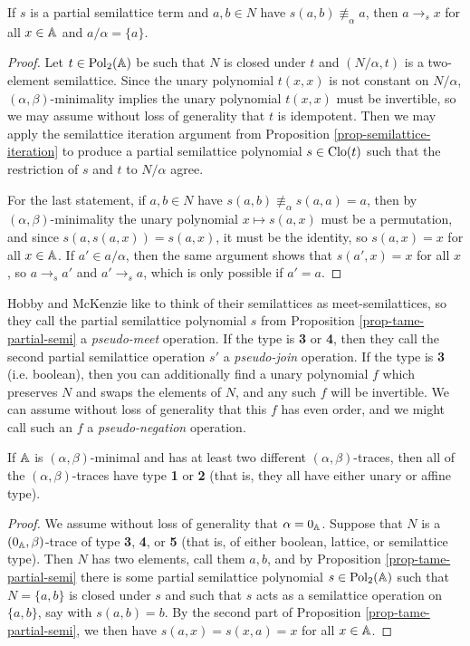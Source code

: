 \begin{appendices}
\begin{prop}
If $s$ is a partial semilattice term and $a,b \in N$ have $s(a,b) \not\equiv_\alpha a$, then $a \rightarrow_s x$ for all $x \in \mathbb{A}$ and $a/\alpha = \{a\}$.
\end{prop}
\begin{proof} Let $t \in \operatorname{Pol}_2(\mathbb{A})$ be such that $N$ is closed under $t$ and $(N/\alpha, t)$ is a two-element semilattice. Since the unary polynomial $t(x,x)$ is not constant on $N/\alpha$, $(\alpha,\beta)$-minimality implies the unary polynomial $t(x,x)$ must be invertible, so we may assume without loss of generality that $t$ is idempotent. Then we may apply the semilattice iteration argument from Proposition \ref{prop-semilattice-iteration} to produce a partial semilattice polynomial $s \in \operatorname{Clo}(t)$ such that the restriction of $s$ and $t$ to $N/\alpha$ agree.

For the last statement, if $a,b \in N$ have $s(a,b) \not\equiv_\alpha s(a,a) = a$, then by $(\alpha,\beta)$-minimality the unary polynomial $x \mapsto s(a,x)$ must be a permutation, and since $s(a,s(a,x)) = s(a,x)$, it must be the identity, so $s(a,x) = x$ for all $x \in \mathbb{A}$. If $a' \in a/\alpha$, then the same argument shows that $s(a',x) = x$ for all $x$, so $a \rightarrow_s a'$ and $a' \rightarrow_s a$, which is only possible if $a' = a$.
\end{proof}

Hobby and McKenzie \cite{hobby-mckenzie} like to think of their semilattices as meet-semilattices, so they call the partial semilattice polynomial $s$ from Proposition \ref{prop-tame-partial-semi} a \emph{pseudo-meet} operation. If the type is \textbf{3} or \textbf{4}, then they call the second partial semilattice operation $s'$ a \emph{pseudo-join} operation. If the type is \textbf{3} (i.e. boolean), then you can additionally find a unary polynomial $f$ which preserves $N$ and swaps the elements of $N$, and any such $f$ will be invertible. We can assume without loss of generality that this $f$ has even order, and we might call such an $f$ a \emph{pseudo-negation} operation.

\begin{prop}\label{prop-single-trace} If $\mathbb{A}$ is $(\alpha,\beta)$-minimal and has at least two different $(\alpha,\beta)$-traces, then all of the $(\alpha,\beta)$-traces have type \textbf{1} or \textbf{2} (that is, they all have either unary or affine type).
\end{prop}
\begin{proof} We assume without loss of generality that $\alpha = 0_{\mathbb{A}}$. Suppose that $N$ is a $(0_{\mathbb{A}},\beta)$-trace of type \textbf{3}, \textbf{4}, or \textbf{5} (that is, of either boolean, lattice, or semilattice type). Then $N$ has two elements, call them $a,b$, and by Proposition \ref{prop-tame-partial-semi} there is some partial semilattice polynomial $s \in \operatorname{Pol}_2(\mathbb{A})$ such that $N = \{a,b\}$ is closed under $s$ and such that $s$ acts as a semilattice operation on $\{a,b\}$, say with $s(a,b) = b$. By the second part of Proposition \ref{prop-tame-partial-semi}, we then have $s(a,x) = s(x,a) = x$ for all $x \in \mathbb{A}$.


\end{proof}
\end{appendices}
